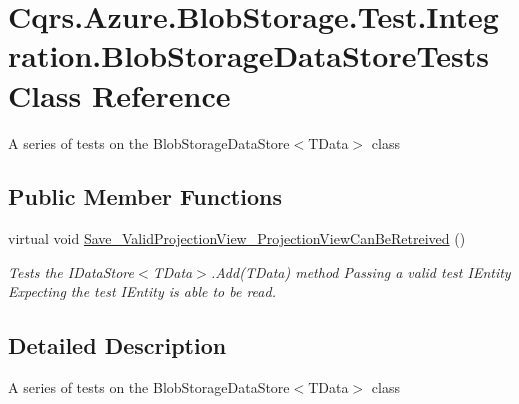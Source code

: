 \hypertarget{classCqrs_1_1Azure_1_1BlobStorage_1_1Test_1_1Integration_1_1BlobStorageDataStoreTests}{}\section{Cqrs.\+Azure.\+Blob\+Storage.\+Test.\+Integration.\+Blob\+Storage\+Data\+Store\+Tests Class Reference}
\label{classCqrs_1_1Azure_1_1BlobStorage_1_1Test_1_1Integration_1_1BlobStorageDataStoreTests}


A series of tests on the Blob\+Storage\+Data\+Store$<$\+T\+Data$>$ class  


\subsection*{Public Member Functions}
\begin{DoxyCompactItemize}
\item 
virtual void \hyperlink{classCqrs_1_1Azure_1_1BlobStorage_1_1Test_1_1Integration_1_1BlobStorageDataStoreTests_a14f230934464191e0af7aad552200cc0_a14f230934464191e0af7aad552200cc0}{Save\+\_\+\+Valid\+Projection\+View\+\_\+\+Projection\+View\+Can\+Be\+Retreived} ()
\begin{DoxyCompactList}\small\item\em Tests the I\+Data\+Store$<$\+T\+Data$>$.\+Add(\+T\+Data) method Passing a valid test I\+Entity Expecting the test I\+Entity is able to be read. \end{DoxyCompactList}\end{DoxyCompactItemize}


\subsection{Detailed Description}
A series of tests on the Blob\+Storage\+Data\+Store$<$\+T\+Data$>$ class 



